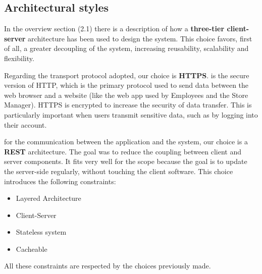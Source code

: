 \subsection{Architectural styles}
In the overview section (2.1) there is a description of how a \textbf{three-tier client-server} architecture has been used to design the system. This choice favors, first of all, a greater decoupling of the system, increasing reusability, scalability and
flexibility. 

Regarding the transport protocol adopted, our choice is \textbf{HTTPS}. is the secure version of HTTP, which is the primary protocol used to send data between the web browser and a website (like the web app used by Employees and the Store Manager). HTTPS is encrypted to increase the security of data transfer. This is particularly important when users transmit sensitive data, such as by logging into their account.

for the communication between the application and the system, our choice is a \textbf{REST} architecture. The goal was to reduce the coupling between client and server components. It fits very well for the scope because the goal is to update the server-side regularly, without touching the client software. This choice introduces the following constraints:
\begin{itemize}
    \item Layered Architecture
    \item Client-Server
    \item Stateless system
    \item Cacheable
\end{itemize}
All these constraints are respected by the choices previously made.

